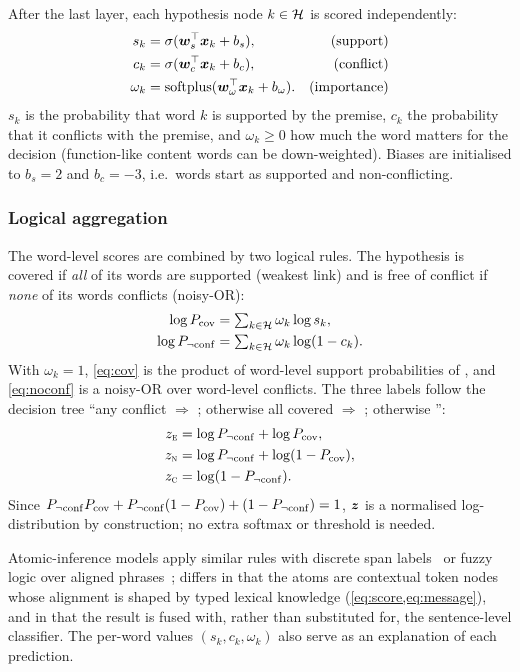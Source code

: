 After the last layer, each hypothesis node $k\in\mathcal{H}$ is scored independently:
\begin{align}
  s_k &= \sigma(\bm{w}_s^{\top}\bm{x}_k + b_s), &\text{(support)}\\
  c_k &= \sigma(\bm{w}_c^{\top}\bm{x}_k + b_c), &\text{(conflict)}\\
  \omega_k &= \operatorname{softplus}(\bm{w}_\omega^{\top}\bm{x}_k + b_\omega). &\text{(importance)}
\end{align}
$s_k$ is the probability that word $k$ is supported by the premise, $c_k$ the probability that it
conflicts with the premise, and $\omega_k\ge 0$ how much the word matters for the decision (function-like
content words can be down-weighted). Biases are initialised to $b_s=2$ and $b_c=-3$, i.e.\ words start
as supported and non-conflicting.

\subsubsection{Logical aggregation}
\label{sec:aggregation}

The word-level scores are combined by two logical rules. The hypothesis is covered if \emph{all} of its words are supported (weakest link) and is free of
conflict if \emph{none} of its words conflicts (noisy-OR):
\begin{align}
  \log P_{\mathrm{cov}} &= \textstyle\sum_{k\in\mathcal{H}} \omega_k \log s_k, \label{eq:cov}\\
  \log P_{\neg\mathrm{conf}}  &= \textstyle\sum_{k\in\mathcal{H}} \omega_k \log (1-c_k). \label{eq:noconf}
\end{align}
With $\omega_k=1$, \cref{eq:cov} is the product of word-level support probabilities of
\citet{glickman2005probabilistic}, and \cref{eq:noconf} is a noisy-OR over word-level conflicts. The
three labels follow the decision tree ``any conflict $\Rightarrow$ \C; otherwise all covered
$\Rightarrow$ \E; otherwise \N'':
\begin{equation}
  \begin{aligned}
    z_{\textsc{e}} &= \log P_{\neg\mathrm{conf}} + \log P_{\mathrm{cov}},\\
    z_{\textsc{n}} &= \log P_{\neg\mathrm{conf}} + \log(1-P_{\mathrm{cov}}),\\
    z_{\textsc{c}} &= \log(1-P_{\neg\mathrm{conf}}).
  \end{aligned}
  \label{eq:z}
\end{equation}
Since $P_{\neg\mathrm{conf}}P_{\mathrm{cov}}+P_{\neg\mathrm{conf}}(1-P_{\mathrm{cov}})+(1-P_{\neg\mathrm{conf}})=1$, $\bm{z}$ is a normalised log-distribution by
construction; no extra softmax or threshold is needed.

Atomic-inference models apply similar rules with
discrete span labels~\citep{stacey2022logical} or fuzzy logic over aligned phrases~\citep{wu2023weakly};
\model{} differs in that the atoms are contextual token nodes whose alignment is shaped by typed lexical
knowledge (\cref{eq:score,eq:message}), and in that the result is fused with, rather than substituted for,
the sentence-level classifier. The per-word values $(s_k,c_k,\omega_k)$ also serve as an explanation of
each prediction.

